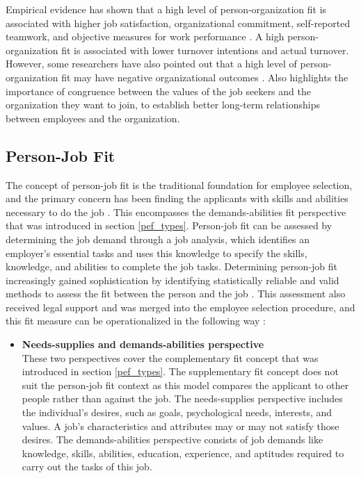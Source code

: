 \documentclass[draft,final]{thesisclass} %
\begin{document}
Empirical evidence has shown that a high level of person-organization fit is associated with higher job satisfaction, organizational commitment, self-reported teamwork, and objective measures for work performance \parencite[183]{po_and_pj_fit_literature_review}.
A high person-organization fit is associated with lower turnover intentions and actual turnover. However, some researchers have also pointed out that a high level of person-organization fit may have negative organizational outcomes \parencite[183]{po_and_pj_fit_literature_review}.
Also \textcite[308]{person_organization_fit} highlights the importance of congruence between the values of the job seekers and the organization they want to join, to establish better long-term relationships between employees and the organization.

\subsection{Person-Job Fit}
The concept of person-job fit is the traditional foundation for employee selection, and the primary concern has been finding the applicants with skills and abilities necessary to do the job \parencite[183]{po_and_pj_fit_literature_review}.
This encompasses the demands-abilities fit perspective that was introduced in section \ref{pef_types}.
Person-job fit can be assessed by determining the job demand through a job analysis, which identifies an employer's essential tasks and uses this knowledge to specify the skills, knowledge, and abilities to complete the job tasks.
Determining person-job fit increasingly gained sophistication by identifying statistically reliable and valid methods to assess the fit between the person and the job \parencite[183]{po_and_pj_fit_literature_review}.
This assessment also received legal support and was merged into the employee selection procedure, and this fit measure can be operationalized in the following way \parencite[183-184]{po_and_pj_fit_literature_review}:
\begin{itemize}
    \item \textbf{Needs-supplies and demands-abilities perspective}\\
    These two perspectives cover the complementary fit concept that was introduced in section \ref{pef_types}.
    The supplementary fit concept does not suit the person-job fit context as this model compares the applicant to other people rather than against the job.
    The needs-supplies perspective includes the individual's desires, such as goals, psychological needs, interests, and values. A job's characteristics and attributes may or may not satisfy those desires.
    The demands-abilities perspective consists of job demands like knowledge, skills, abilities, education, experience, and aptitudes required to carry out the tasks of this job.
\end{itemize}
\end{document}
